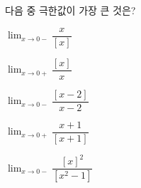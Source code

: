 다음 중 극한값이 가장 큰 것은? 
\begin{choicesii}{\rule[-3ex]{0pt}{8ex}$\displaystyle\lim_{x\to 0-} \dfrac{x}{[x]}$}{\rule[-3ex]{0pt}{8ex}$\displaystyle\lim_{x\to 0+} \dfrac{[x]}{x}$}{\rule[-3ex]{0pt}{8ex}$\displaystyle\lim_{x\to 0-} \dfrac{[x-2]}{x-2}$}{\rule[-3ex]{0pt}{8ex}$\displaystyle\lim_{x\to 0+} \dfrac{x+1}{[x+1]}$}{\rule[-3ex]{0pt}{8ex}$\displaystyle\lim_{x\to 0-} \dfrac{[x]^2}{[x^2-1]}$}\end{choicesii}
